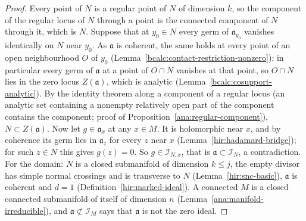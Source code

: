 \begin{proof}
\leanok
Every point of \(N\) is a regular point of \(N\) of dimension \(k\), so the component of the regular locus of \(N\) through a point is the connected component of \(N\)
through it, which is \(N\). Suppose that at \(y_0\in N\) every germ of \(\mathfrak a_{y_0}\) vanishes identically on \(N\) near \(y_0\). As \(\mathfrak a\) is coherent, the
same holds at every point of an open neighbourhood \(O\) of \(y_0\) (Lemma~\ref{bcalc:contact-restriction-nonzero}); in particular every germ of \(\mathfrak a\) at a point of
\(O\cap N\) vanishes at that point, so \(O\cap N\) lies in the zero locus \(Z(\mathfrak a)\), which is analytic (Lemma~\ref{bcalc:cosupport-analytic}). By the identity
theorem along a component of a regular locus (an analytic set containing a nonempty relatively open part of the component contains the component; proof of
Proposition~\ref{ana:regular-component}), \(N\subset Z(\mathfrak a)\). Now let \(g\in\mathfrak a_x\) at any \(x\in M\). It is holomorphic near \(x\), and by coherence its germ lies in
\(\mathfrak a_z\) for every \(z\) near \(x\) (Lemma~\ref{hir:hadamard-bridge}); for such \(z\in N\) this gives \(g(z)=0\). So \(g\in\mathcal I_{N,x}\), that is
\(\mathfrak a\subset\mathcal I_N\), a contradiction. For the domain: \(N\) is a closed submanifold of dimension \(k\le j\), the empty divisor has simple normal crossings and
is transverse to \(N\) (Lemma~\ref{hir:snc-basic}), \(\mathfrak a\) is coherent and \(d=1\) (Definition~\ref{hir:marked-ideal}). A connected \(M\) is a closed connected
submanifold of itself of dimension \(n\) (Lemma~\ref{ana:manifold-irreducible}), and \(\mathfrak a\not\subset\mathcal I_M\) says that \(\mathfrak a\) is not the zero ideal.
\end{proof}

